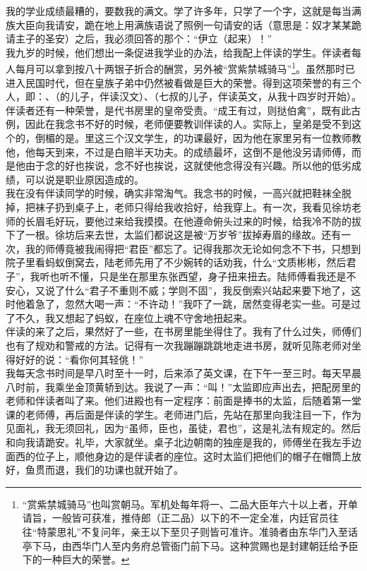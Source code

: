 我的学业成绩最糟的，要数我的满文。学了许多年，只学了一个字，这就是每当满族大臣向我请安，跪在地上用满族语说了照例一句请安的话（意思是：奴才某某跪请主子的圣安）之后，我必须回答的那个：“伊立（起来）！”\\

我九岁的时候，他们想出一条促进我学业的办法，给我配上伴读的学生。伴读者每人每月可以拿到按八十两银子折合的酬赏，另外被“赏紫禁城骑马”\footnote{“赏紫禁城骑马”也叫赏朝马。军机处每年将一、二品大臣年六十以上者，开单请旨，一般皆可获准，推侍郎（正二品）以下的不一定全准，内廷官员往往“特蒙思礼”不复问年，亲王以下至贝子则皆可准许。准骑者由东华门入至话亭下马，由西华门人至内务府总管衙门前下马。这种赏赐也是封建朝廷给予臣下的一种巨大的荣誉。}。虽然那时已进入民国时代，但在皇族子弟中仍然被看做是巨大的荣誉。得到这项荣誉的有三个人，即：、（的儿子，伴读汉文）、（七叔的儿子，伴读英文，从我十四岁时开始）。伴读者还有一种荣誉，是代书房里的皇帝受责。“成王有过，则挞伯禽”，既有此古例，因此在我念书不好的时候，老师便要教训伴读的人。实际上，皇弟是受不到这个的，倒楣的是。里这三个汉文学生，的功课最好，因为他在家里另有一位教师教他，他每天到来，不过是白赔半天功夫。的成绩最坏，这倒不是他没另请师傅，而是他由于念的好也挨说，念不好也挨说，这就使他念得没有兴趣。所以他的低劣成绩，可以说是职业原因造成的。\\

我在没有伴读同学的时候，确实非常淘气。我念书的时候，一高兴就把鞋袜全脱掉，把袜子扔到桌子上，老师只得给我收拾好，给我穿上。有一次，我看见徐坊老师的长眉毛好玩，要他过来给我摸摸。在他遵命俯头过来的时候，给我冷不防的拔下了一根。徐坊后来去世，太监们都说这是被“万岁爷”拔掉寿眉的缘故。还有一次，我的师傅竟被我闹得把“君臣”都忘了。记得我那次无论如何念不下书，只想到院子里看蚂蚁倒窝去，陆老师先用了不少婉转的话劝我，什么“文质彬彬，然后君子”，我听也听不懂，只是坐在那里东张西望，身子扭来扭去。陆师傅看我还是不安心，又说了什么“君子不重则不威；学则不固”，我反倒索兴站起来要下地了，这时他着急了，忽然大喝一声：“不许动！”我吓了一跳，居然变得老实一些。可是过了不久，我又想起了蚂蚁，在座位上魂不守舍地扭起来。\\

伴读的来了之后，果然好了一些，在书房里能坐得住了。我有了什么过失，师傅们也有了规劝和警戒的方法。记得有一次我蹦蹦跳跳地走进书房，就听见陈老师对坐得好好的说：“看你何其轻佻！”\\

我每天念书时间是早八时至十一时，后来添了英文课，在下午一至三时。每天早晨八时前，我乘坐金顶黄轿到达。我说了一声：“叫！”太监即应声出去，把配房里的老师和伴读者叫了来。他们进殿也有一定程序：前面是捧书的太监，后随着第一堂课的老师傅，再后面是伴读的学生。老师进门后，先站在那里向我注目一下，作为见面礼，我无须回礼，因为“虽师，臣也，虽徒，君也”，这是礼法有规定的。然后和向我请跪安。礼毕，大家就坐。桌子北边朝南的独座是我的，师傅坐在我左手边面西的位子上，顺他身边的是伴读者的座位。这时太监们把他们的帽子在帽筒上放好，鱼贯而退，我们的功课也就开始了。\\

